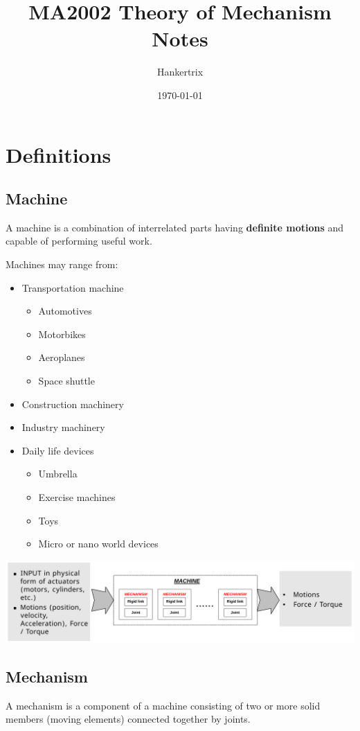 \documentclass[11pt]{article}
\author{Hankertrix}
\date{\today}
\title{MA2002 Theory of Mechanism Notes}
\begin{document}
\maketitle
\setcounter{tocdepth}{2}
\tableofcontents \clearpage\section{Definitions}
\label{sec:orge3600fb}

\subsection{Machine}
\label{sec:orgd21ab29}
A machine is a combination of interrelated parts having \textbf{definite motions} and capable of performing useful work.

Machines may range from:
\begin{itemize}
\item Transportation machine
\begin{itemize}
\item Automotives
\item Motorbikes
\item Aeroplanes
\item Space shuttle
\end{itemize}
\item Construction machinery
\item Industry machinery
\item Daily life devices
\begin{itemize}
\item Umbrella
\item Exercise machines
\item Toys
\item Micro or nano world devices
\end{itemize}
\end{itemize}

\begin{center}
\includegraphics[width=.9\linewidth]{./images/machine-flow-chart.png}
\end{center}
\subsection{Mechanism}
\label{sec:orgaaaaabe}
A mechanism is a component of a machine consisting of two or more solid members (moving elements) connected together by joints.
\end{document}
